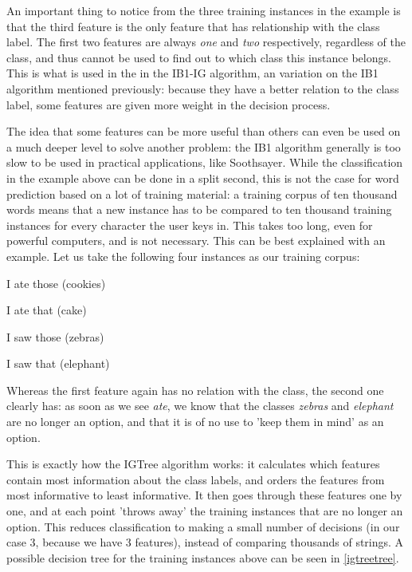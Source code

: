 \documentclass[12pt]{article}
\begin{document}
An important thing to notice from the three training instances in the example is that the third feature is the only feature that has relationship with the class label. The first two features are always \emph{one} and \emph{two} respectively, regardless of the class, and thus cannot be used to find out to which class this instance belongs. This is what is used in the in the IB1-IG algorithm, an variation on the IB1 algorithm mentioned previously: because they have a better relation to the class label, some features are given more weight in the decision process.

The idea that some features can be more useful than others can even be used on a much deeper level to solve another problem: the IB1 algorithm generally is too slow to be used in practical applications, like Soothsayer. While the classification in the example above can be done in a split second, this is not the case for word prediction based on a lot of training material: a training corpus of ten thousand words means that a new instance has to be compared to ten thousand training instances for every character the user keys in. This takes too long, even for powerful computers, and is not necessary. This can be best explained with an example. Let us take the following four instances as our training corpus:

\begin{examples}
\item I ate those (cookies)
\item I ate that (cake)
\item I saw those (zebras)
\item I saw that (elephant)
\end{examples}

Whereas the first feature again has no relation with the class, the second one clearly has: as soon as we see \emph{ate}, we know that the classes \emph{zebras} and \emph{elephant} are no longer an option, and that it is of no use to 'keep them in mind' as an option.

This is exactly how the IGTree algorithm \cite{daelemans+97} works: it calculates which features contain most information about the class labels, and orders the features from most informative to least informative. It then goes through these features one by one, and at each point 'throws away' the training instances that are no longer an option. This reduces classification to making a small number of decisions (in our case 3, because we have 3 features), instead of comparing thousands of strings. A possible decision tree for the training instances above can be seen in \ref{igtreetree}.
\end{document}
